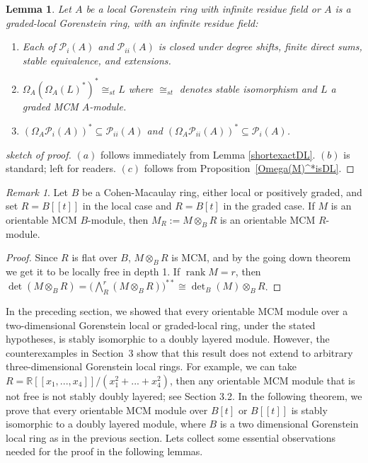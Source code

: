 \documentclass[11pt,letterpaper]{amsart}
\newcommand{\x}{\xrightarrow{}}
\DeclareMathOperator{\rank}{rank}
\theoremstyle{plain}
\newtheorem{lem}[thm]{Lemma}
\theoremstyle{definition}
\theoremstyle{remark}
\newtheorem{remark}[thm]{Remark}
\begin{document}
\begin{lem}\label{lem:closure}
Let $A$ be a local Gorenstein ring with infinite residue field or $A$ is a graded-local Gorenstein ring, with an infinite residue field:
\begin{enumerate}
\item[$(a)$] Each of $\mathcal{P}_{i}(A)$ and $\mathcal{P}_{ii}(A)$ is closed under degree shifts, finite direct sums, stable equivalence, and extensions.
\item[(b)] $\Omega_A(\Omega_A(L)^*)^*\cong_{st} L$ where $\cong_{st}$ denotes stable isomorphism and $L$ a graded MCM $A$-module.
\item[(c)] $
(\Omega_A\mathcal{P}_{i}(A))^*\subseteq\mathcal{P}_{ii}(A)$ and
$(\Omega_A\mathcal{P}_{ii}(A))^*\subseteq\mathcal{P}_{i}(A)$.
\end{enumerate}
\end{lem}
\begin{proof}[sketch of proof] $(a)$ follows immediately from Lemma \ref{shortexactDL}. $(b)$ is standard; left for readers. $(c)$ follows from Proposition~\ref{Omega(M)^*isDL}. %
\end{proof}

\begin{remark}

Let $B$ be a Cohen-Macaulay ring, either local or positively
graded, and set $R=B[[t]]$ in the local case and $R=B[t]$
in the graded case. If $M$ is an orientable MCM $B$-module, then
$M_R:=M\otimes_B R$ is an orientable MCM $R$-module. 
\end{remark}
\begin{proof}
Since $R$ is flat over $B$, $M\otimes_B R$ is MCM, and by the going down theorem we get it to be locally free in depth 1.
If $\rank M=r$, then $
\det(M\otimes_B R)=\big(\textstyle\bigwedge^r_R (M\otimes_B R)\big)^{**}
 \cong \det_B(M)\otimes_B R$.
\end{proof}

In the preceding section, we showed that every orientable
MCM module over a two-dimensional Gorenstein local or graded-local ring, under the stated hypotheses, is stably isomorphic to a doubly layered module. However, the counterexamples in Section~3 show that this result does not extend to arbitrary three-dimensional Gorenstein local rings. For example, we can take $R=\mathbb R[[x_1,...,x_4]]/(x_1^2+...+x_4^2)$, then any orientable MCM module that is not free is not stably doubly layered; see Section 3.2. In the following theorem, we prove that every orientable MCM module over $B[t]$ or $B[[t]]$ is stably isomorphic to a doubly layered module, where $B$ is a two dimensional Gorenstein local ring as in the previous section. Lets collect some essential observations needed for the proof in the following lemmas.  
\end{document}
